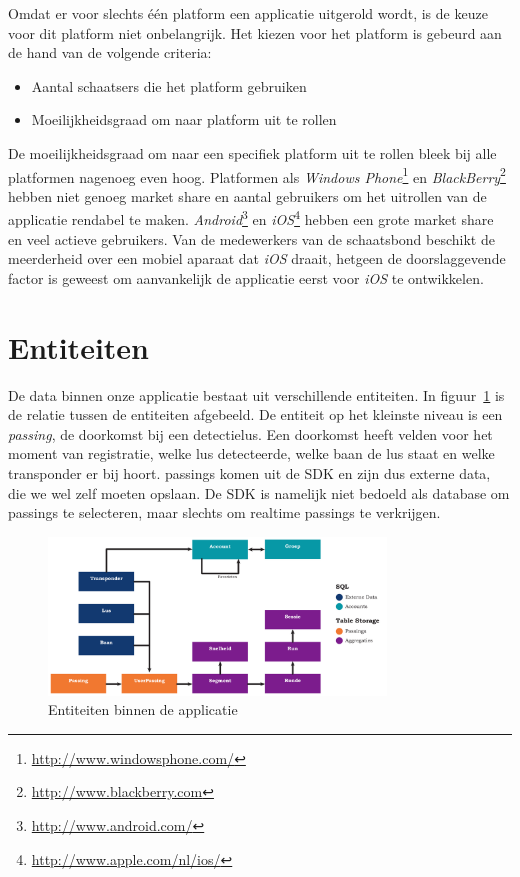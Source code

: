 Omdat er voor slechts één platform een applicatie uitgerold wordt, is de keuze voor dit platform niet onbelangrijk. Het kiezen voor het platform is gebeurd aan de hand van de volgende criteria:
\begin{itemize}
\item Aantal schaatsers die het platform gebruiken
\item Moeilijkheidsgraad om naar platform uit te rollen
\end{itemize}

De moeilijkheidsgraad om naar een specifiek platform uit te rollen bleek bij alle platformen nagenoeg even hoog. Platformen als \textit{Windows Phone}\footnote{\url{http://www.windowsphone.com/}} en \textit{BlackBerry}\footnote{\url{http://www.blackberry.com}} hebben niet genoeg market share en aantal gebruikers om het uitrollen van de applicatie rendabel te maken. \textit{Android}\footnote{\url{http://www.android.com/}} en \textit{iOS}\footnote{\url{http://www.apple.com/nl/ios/}} hebben een grote market share en veel actieve gebruikers. Van de medewerkers van de schaatsbond beschikt de meerderheid over een mobiel aparaat dat \textit{iOS} draait, hetgeen de doorslaggevende factor is geweest om aanvankelijk de applicatie eerst voor \textit{iOS} te ontwikkelen.

\section{Entiteiten}
De data binnen onze applicatie bestaat uit verschillende entiteiten. In figuur~\ref{fig:entities} is de relatie tussen de entiteiten afgebeeld. De entiteit op het kleinste niveau is een \textit{passing}, de doorkomst bij een detectielus. Een doorkomst heeft velden voor het moment van registratie, welke lus detecteerde, welke baan de lus staat en welke transponder er bij hoort. passings komen uit de \mylaps SDK en zijn dus externe data, die we wel zelf moeten opslaan. De \mylaps SDK is namelijk niet bedoeld als database om passings te selecteren, maar slechts om realtime passings te verkrijgen.

\begin{figure}
\centering
\includegraphics[width=0.8\textwidth]{style/images/Entiteiten}
\caption{Entiteiten binnen de applicatie}
\label{fig:entities}
\end{figure}



